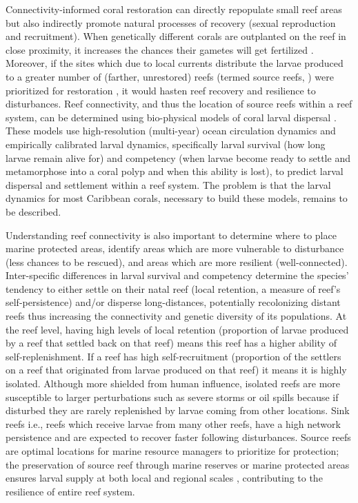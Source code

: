 \documentclass[preprint,12pt,authoryear]{elsarticle}
\begin{document}
Connectivity-informed coral restoration can directly repopulate small reef areas but also indirectly promote natural processes of recovery (sexual reproduction and recruitment). When genetically different corals are outplanted on the reef in close proximity, it increases the chances their gametes will get fertilized \citep{omori2019coral}. Moreover, if the sites which due to local currents distribute the larvae produced to a greater number of (farther, unrestored) reefs (termed source reefs, \citealp{bode2018resilient}) were prioritized for restoration \citep{king2023larval}, it would hasten reef recovery and resilience to disturbances. Reef connectivity, and thus the location of source reefs within a reef system, can be determined using bio-physical models of coral larval dispersal \citep{frys2020fine, figueiredo2022global,king2023larval}. These models use high-resolution (multi-year) ocean circulation dynamics and empirically calibrated larval dynamics, specifically larval survival (how long larvae remain alive for) and competency (when larvae become ready to settle and metamorphose into a coral polyp and when this ability is lost), to predict larval dispersal and settlement within a reef system. The problem is that the larval dynamics for most Caribbean corals, necessary to build these models, remains to be described.

Understanding reef connectivity is also important to determine where to place marine protected areas, identify areas which are more vulnerable to disturbance (less chances to be rescued), and areas which are more resilient (well-connected). Inter-specific differences in larval survival and competency determine the species’ tendency to either settle on their natal reef (local retention, a measure of reef’s self-persistence) and/or disperse long-distances, potentially recolonizing distant reefs thus increasing the connectivity and genetic diversity of its populations. At the reef level, having high levels of local retention (proportion of larvae produced by a reef that settled back on that reef) means this reef has a higher ability of self-replenishment. If a reef has high self-recruitment (proportion of the settlers on a reef that originated from larvae produced on that reef) it means it is highly isolated.  Although more shielded from human influence, isolated reefs are more susceptible to larger perturbations such as severe storms or oil spills \citep{baumann2022remoteness} because if disturbed they are rarely replenished by larvae coming from other locations. Sink reefs i.e., reefs which receive larvae from many other reefs, have a high network persistence and are expected to recover faster following disturbances. Source reefs are optimal locations for marine resource managers to prioritize for protection; the preservation of source reef through marine reserves or marine protected areas ensures larval supply at both local and regional scales \citep{muenzel2023integrating}, contributing to the resilience of entire reef system.
\end{document}
